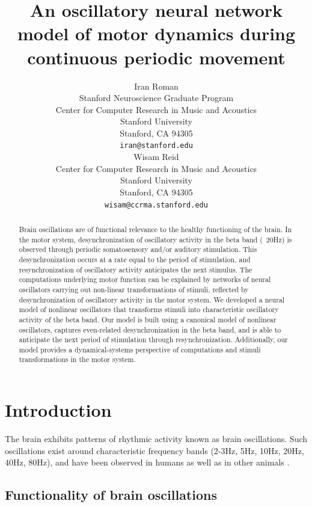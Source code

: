 \documentclass{article}
\title{An oscillatory neural network model of motor dynamics during continuous periodic movement}
\author{
  Iran Roman\\
  Stanford Neuroscience Graduate Program\\
  Center for Computer Research in Music and Acoustics\\
  Stanford University\\
  Stanford, CA 94305 \\
  \texttt{iran@stanford.edu} \\
\And
Wisam Reid \\
  Center for Computer Research in Music and Acoustics\\
  Stanford University\\
  Stanford, CA 94305 \\
  \texttt{wisam@ccrma.stanford.edu} \\
}
\begin{document}

\maketitle

\begin{abstract}
Brain oscillations are of functional relevance to the healthy functioning of the brain. In the motor system, desynchronization of oscillatory activity in the beta band (~20Hz) is observed through periodic somatosensory and/or auditory stimulation. This desynchronization occurs at a rate equal to the period of stimulation, and resynchronization of oscillatory activity anticipates the next stimulus. The computations underlying motor function can be explained by networks of neural oscillators carrying out non-linear transformations of stimuli, reflected by desynchronization of oscillatory activity in the motor system. We developed a neural model of nonlinear oscillators that transforms stimuli into characteristic oscillatory activity of the beta band. Our model is built using a canonical model of nonlinear oscillators, captures even-related desynchronization in the beta band, and is able to anticipate the next period of stimulation through resynchronization. Additionally, our model provides a dynamical-systems perspective of computations and stimuli transformations in the motor system.
\end{abstract}

\section{Introduction}

The brain exhibits patterns of rhythmic activity known as brain oscillations. Such oscillations exist around characteristic frequency bands (2-3Hz, 5Hz, 10Hz, 20Hz, 40Hz, 80Hz), and have been observed in humans as well as in other animals \cite{giraud2012cortical}. 

\subsection{Functionality of brain oscillations}
\end{document}
